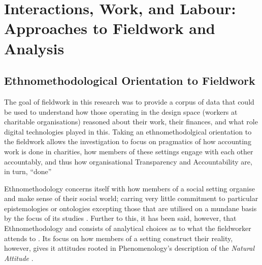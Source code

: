 \section{Interactions, Work, and Labour: Approaches to Fieldwork and Analysis}
\label{sec:method:fieldwork}





\subsection{Ethnomethodological Orientation to Fieldwork}
The goal of fieldwork in this research was to provide a corpus of data that could be used to understand how those operating in the design space (workers at charitable organisations) reasoned about their work, their finances, and what role digital technologies played in this. Taking an ethnomethodolgical orientation to the fieldwork allows the investigation to focus on pragmatics of how accounting work is done in charities, how members of these settings engage with each other accountably, and thus how organisational Transparency and Accountability are, in turn, ``done'' \cite{crabtree_doing_2012, garfinkel_studies_1967}

Ethnomethodology concerns itself with how members of a social setting organise and make sense of their social world; carring very little commitment to particular epistemologies or ontologies excepting those that are utilised on a mundane basis by the focus of its studies \cite{randall_fieldwork_2007, garfinkel_studies_1967}. Further to this, it has been said, however, that Ethnomethodology  and consists of analytical choices as to what the fieldworker attends to \cite{randall_fieldwork_2007}. Its focus on how members of a setting construct their reality, however, gives it attitudes rooted in Phenomenology's description of the \textit{Natural Attitude} \cite{sharrock_ethnomethodologists_1986}.

